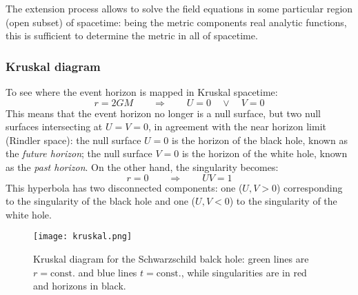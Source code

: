The extension process allows to solve the field equations in some particular region (open subset) of spacetime: being the metric components real analytic functions, this is sufficient to determine the metric in all of spacetime.

\subsubsection{Kruskal diagram}

To see where the event horizon is mapped in Kruskal spacetime:
\begin{equation*}
  r = 2GM
  \qquad \Rightarrow \qquad
  U = 0 \quad \lor \quad V = 0
\end{equation*}
This means that the event horizon no longer is a null surface, but two null surfaces intersecting at $ U = V = 0 $, in agreement with the near horizon limit (Rindler space): the null surface $ U = 0 $ is the horizon of the black hole, known as the \textit{future horizon}; the null surface $ V = 0 $ is the horizon of the white hole, known as the \textit{past horizon}.
On the other hand, the singularity becomes:
\begin{equation*}
  r = 0
  \qquad \Rightarrow \qquad
  UV = 1
\end{equation*}
This hyperbola has two disconnected components: one ($ U,V > 0 $) corresponding to the singularity of the black hole and one ($ U,V < 0 $) to the singularity of the white hole.

\begin{figure}
  \centering
  \texttt{[image: kruskal.png]}
  \caption{Kruskal diagram for the Schwarzschild balck hole: green lines are $ r = \text{const.} $ and blue lines $ t = \text{const.} $, while singularities are in red and horizons in black.}
  \label{kruskal}
\end{figure}

